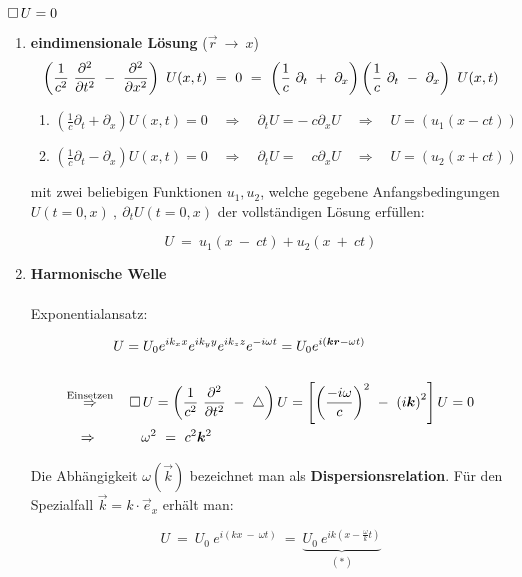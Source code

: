 $\mathop{{}\Box}\nolimits U = 0$

\begin{enumerate}[label=\textbf{\arabic* .}]
\item \textbf{eindimensionale Lösung} ($\vec{r}\  \rightarrow \ x$)
\begin{equation*}
\left(\frac{1}{c^2} \ \pddiff{}{t} \ - \ \pddiff{}{x}\right)\ U(x,t) \ = \ 0 \ = \ \left(\frac{1}{c}\ \partial_t \ + \ \partial_x\right)\left(\frac{1}{c} \ \partial_t \ - \ \partial_x\right) \ U(x,t)
\end{equation*}

\begin{enumerate}
\item $\left(\frac{1}{c}\partial_t+\partial_x\right)U(x,t) = 0 \quad\Rightarrow\quad \partial_t U = - \ c \partial_x U \quad\Rightarrow\quad U = (u_1(x-ct))$
\item $\left(\frac{1}{c}\partial_t-\partial_x\right)U(x,t) = 0 \quad\Rightarrow\quad \partial_t U =\quad c \partial_x U \quad\Rightarrow\quad U = (u_2(x+ct))$
\end{enumerate}

mit zwei beliebigen Funktionen $u_1,u_2$, welche gegebene Anfangsbedingungen $U(t=0,x) \ , \ \partial_t U(t=0,x)$ der vollständigen Lösung erfüllen:

\begin{equation*}
U \ = \ u_1(x\ -\ ct) + u_2(x\ +\ ct)
\end{equation*}

\item
\textbf{Harmonische Welle}\\
\ \\
Exponentialansatz:

\begin{align*}
& U=U_0 e^{ik_x x}e^{ik_y y}e^{ik_z z}e^{-i\omega t} = U_0 e^{i(\vec{k}\vec{r}-\omega
t)}\\
\ \\
\overset{\text{Einsetzen}}{\Rightarrow} &\quad\Dalembert U = \left(\frac{1}{c^2} \ \pddiff{}{t} \ - \ \laplace\right)U = \left[\left(\frac{-i\omega}{c}\right)^2 \ - \ \left(i\vec{k}\right)^2\right]U = 0\\
\Rightarrow \ \quad&\qquad \omega^2 \ = \ c^2 \vec{k}^2
\end{align*}

Die Abhängigkeit $\omega(\vec{k})$ bezeichnet man als \textbf{Dispersionsrelation}. Für den Spezialfall $\vec{k} = k \cdot \vec{e}_x$ erhält man:

\begin{equation*}
U \ = \ U_0 \ e^{i(kx \ - \ \omega t)} \ = \ \underbrace{U_0 \ e^{ik\left(x-\frac{\omega}{k}t\right)} }_{(*)}
\end{equation*}


\end{enumerate}
